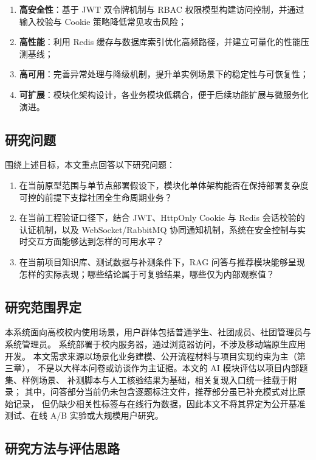\begin{enumerate}
  \item \textbf{高安全性}：基于 JWT 双令牌机制与 RBAC 权限模型构建访问控制，并通过输入校验与 Cookie 策略降低常见攻击风险；
  \item \textbf{高性能}：利用 Redis 缓存与数据库索引优化高频路径，并建立可量化的性能压测基线；
  \item \textbf{高可用}：完善异常处理与降级机制，提升单实例场景下的稳定性与可恢复性；
  \item \textbf{可扩展}：模块化架构设计，各业务模块低耦合，便于后续功能扩展与微服务化演进。
\end{enumerate}

\subsection{研究问题}

围绕上述目标，本文重点回答以下研究问题：
\begin{enumerate}
  \item 在当前原型范围与单节点部署假设下，模块化单体架构能否在保持部署复杂度可控的前提下支撑社团全生命周期业务？
  \item 在当前工程验证口径下，结合 JWT、HttpOnly Cookie 与 Redis 会话校验的认证机制，以及 WebSocket/RabbitMQ 协同通知机制，系统在安全控制与实时交互方面能够达到怎样的可用水平？
  \item 在当前项目知识库、测试数据与补测条件下，RAG 问答与推荐模块能够呈现怎样的实际表现；哪些结论属于可复验结果，哪些仅为内部观察值？
\end{enumerate}

\subsection{研究范围界定}

本系统面向高校校内使用场景，用户群体包括普通学生、社团成员、社团管理员与系统管理员。
系统部署于校内服务器，通过浏览器访问，不涉及移动端原生应用开发。
本文需求来源以场景化业务建模、公开流程材料与项目实现约束为主（第三章），
不是以大样本问卷或访谈作为主证据。本文的 AI 模块评估以项目内部题集、样例场景、
补测脚本与人工核验结果为基础，相关复现入口统一挂载于附录；
其中，问答部分当前仍未包含逐题标注文件，推荐部分虽已补充模式对比原始记录，
但仍缺少相关性标签与在线行为数据，因此本文不将其界定为公开基准测试、在线 A/B 实验或大规模用户研究。

\subsection{研究方法与评估思路}

